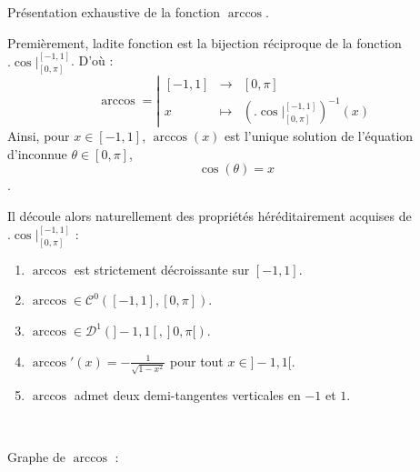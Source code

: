\documentclass{article}
\begin{document}
\begin{question_kholle}{Présentation exhaustive de la fonction $\arccos$.}

  Premièrement, ladite fonction est la bijection réciproque de la fonction $\bigl.\cos\bigr|_{[0,\pi]}^{[-1,1]}$. D'où :
  \[
    \arccos = \left|
    \begin{array}{rcl}
      [-1,1] & \to     & [0 , \pi]                                                 \\ [1ex]
      x      & \mapsto & \left( \bigl.\cos\bigr|_{[0,\pi]}^{[-1,1]}\right)^{-1}(x)
    \end{array}
    \right.
  \]
  Ainsi, pour $x\in [-1,1]$, $\arccos (x)$ est l'unique solution de l'équation d'inconnue $\theta \in \textstyle [0 ,\pi]$, \[\cos(\theta) = x\].

  \noindent Il découle alors naturellement des propriétés héréditairement acquises de $\bigl.\cos\bigr|_{[0,\pi]}^{[-1,1]}$ :

  \begin{enumerate}
    \item $\arccos$ est strictement décroissante sur $[-1,1]$.
    \item $\arccos \in \mathcal{C}^0\left([-1,1],[0 , \pi] \right)$.
    \item $\arccos \in \mathcal{D}^1\left(]-1,1[,]0 ,\pi [ \right)$.
    \item $\displaystyle\arccos'(x) = -\frac{1}{\sqrt{1-x^2}}$ pour tout $x\in]-1,1[$.
    \item $\arccos$ admet deux demi-tangentes verticales en $-1$ et $1$.
  \end{enumerate}

  \

  Graphe de $\arccos$ :
  \begin{figure}[H]
    \centering
\end{figure}
\end{question_kholle}
\end{document}
